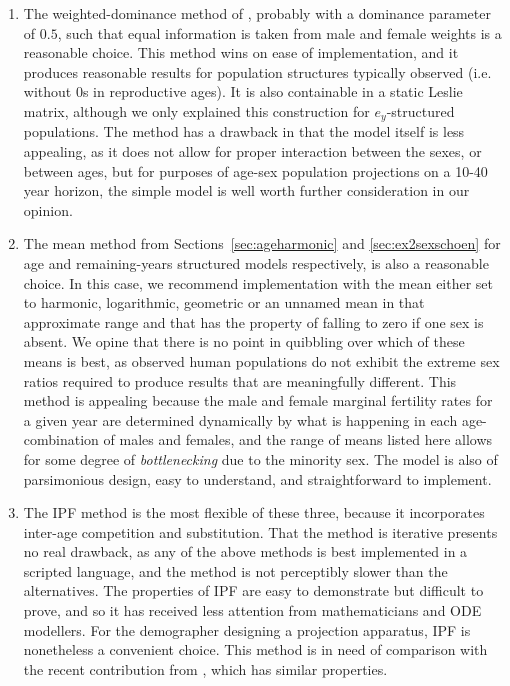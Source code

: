 \begin{enumerate}
\item The weighted-dominance method of \citet{goodman1967age}, probably with
a dominance parameter of $0.5$, such that equal information is taken from male and female
weights is a reasonable choice. This method wins on ease of implementation, and
it produces reasonable results for population structures typically observed (i.e. without 0s in
reproductive ages). It is also containable in a static Leslie matrix, although
we only explained this construction for $e_y$-structured populations. The
method has a drawback in that the model itself is less appealing, as it does 
not allow for proper interaction between the sexes, or between ages, but for
purposes of age-sex population projections on a 10-40 year horizon, the simple
model is well worth further consideration in our opinion.

\item The mean method from Sections~\ref{sec:ageharmonic} and
\ref{sec:ex2sexschoen} for age and remaining-years structured models
respectively, is also a reasonable choice. In this case, we recommend
implementation with the mean either set to harmonic, logarithmic, geometric or
an unnamed mean in that approximate range and that has the property of 
falling to zero if one sex is absent. We opine that there is no point in
quibbling over which of these means is best, as observed human populations do
not exhibit the extreme sex ratios required to produce results that are
meaningfully different. This method is appealing because the male and female
marginal fertility rates for a given year are determined dynamically by 
what is happening in each age-combination of males and females, and the range
of means listed here allows for some degree of \textit{bottlenecking} due to
the minority sex. The model is also of parsimonious design, easy to understand,
and straightforward to implement.

\item The IPF method is the most flexible of these three, because it
incorporates inter-age competition and substitution. That the method is
iterative presents no real drawback, as any of the above methods is best 
implemented in a scripted language, and the method is
not perceptibly slower than the alternatives. The properties of IPF are easy to
demonstrate but difficult to prove, and so it has received less attention from
mathematicians and ODE modellers. For the demographer designing a projection
apparatus, IPF is nonetheless a convenient choice. This method is in need of
comparison with the recent contribution from \citet{choo2006estimating}, which
has similar properties.
\end{enumerate}

